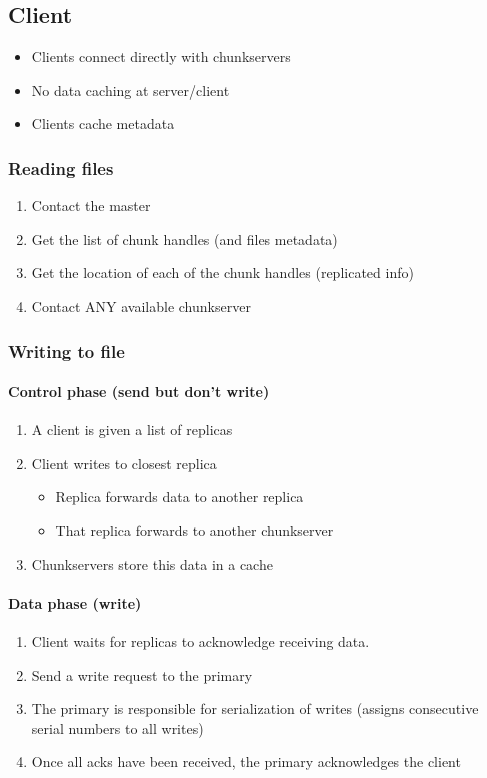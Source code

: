 \subsection{Client}
\begin{itemize}
  \item Clients connect directly with chunkservers
  \item No data caching at server/client
  \item Clients cache metadata
\end{itemize}
\subsubsection{Reading files}
\begin{enumerate}
  \item Contact the master
  \item Get the list of chunk handles (and files metadata)
  \item Get the location of each of the chunk handles (replicated info)
  \item Contact ANY available chunkserver
\end{enumerate}
\subsubsection{Writing to file}
\paragraph{Control phase (send but don't write)}
    \begin{enumerate}
  \item A client is given a list of replicas
  \item Client writes to closest replica
    \begin{itemize}
      \item Replica forwards data to another replica
      \item That replica forwards to another chunkserver
    \end{itemize}
  \item Chunkservers store this data in a cache
\end{enumerate}
\paragraph{Data phase (write)}
\begin{enumerate}
  \item Client waits for replicas to acknowledge receiving data.
  \item Send a write request to the primary
  \item The primary is responsible for serialization of writes (assigns consecutive serial numbers to all writes)  
  \item Once all acks have been received, the primary acknowledges the client
\end{enumerate}





